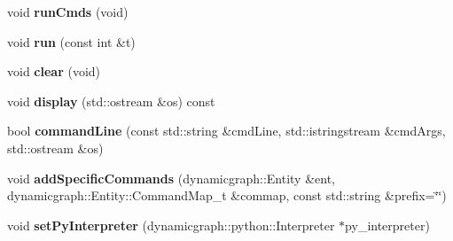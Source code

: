 \begin{DoxyCompactItemize}
\item 
void {\bfseries run\+Cmds} (void)\hypertarget{classdynamic__graph_1_1PeriodicCall_a95a8524fcd1e2a0e8cfac030fcaa67e9}{}\label{classdynamic__graph_1_1PeriodicCall_a95a8524fcd1e2a0e8cfac030fcaa67e9}

\item 
void {\bfseries run} (const int \&t)\hypertarget{classdynamic__graph_1_1PeriodicCall_a03b883cf9713378452c51601c0137285}{}\label{classdynamic__graph_1_1PeriodicCall_a03b883cf9713378452c51601c0137285}

\item 
void {\bfseries clear} (void)\hypertarget{classdynamic__graph_1_1PeriodicCall_a008800cf257d3cf9f16d56d47a2a08a7}{}\label{classdynamic__graph_1_1PeriodicCall_a008800cf257d3cf9f16d56d47a2a08a7}

\item 
void {\bfseries display} (std\+::ostream \&os) const \hypertarget{classdynamic__graph_1_1PeriodicCall_a68beb3c924539e1c2fec32f613f16fcc}{}\label{classdynamic__graph_1_1PeriodicCall_a68beb3c924539e1c2fec32f613f16fcc}

\item 
bool {\bfseries command\+Line} (const std\+::string \&cmd\+Line, std\+::istringstream \&cmd\+Args, std\+::ostream \&os)\hypertarget{classdynamic__graph_1_1PeriodicCall_a042c2a1139e779cd308c9d95b51a8485}{}\label{classdynamic__graph_1_1PeriodicCall_a042c2a1139e779cd308c9d95b51a8485}

\item 
void {\bfseries add\+Specific\+Commands} (dynamicgraph\+::\+Entity \&ent, dynamicgraph\+::\+Entity\+::\+Command\+Map\+\_\+t \&commap, const std\+::string \&prefix=\char`\"{}\char`\"{})\hypertarget{classdynamic__graph_1_1PeriodicCall_a51669d6bc8fa3fd4ccc386f2b9649d57}{}\label{classdynamic__graph_1_1PeriodicCall_a51669d6bc8fa3fd4ccc386f2b9649d57}

\item 
void {\bfseries set\+Py\+Interpreter} (dynamicgraph\+::python\+::\+Interpreter $\ast$py\+\_\+interpreter)\hypertarget{classdynamic__graph_1_1PeriodicCall_a6b6534066019b42f1cf671bb0cb24ec5}{}\label{classdynamic__graph_1_1PeriodicCall_a6b6534066019b42f1cf671bb0cb24ec5}

\end{DoxyCompactItemize}
